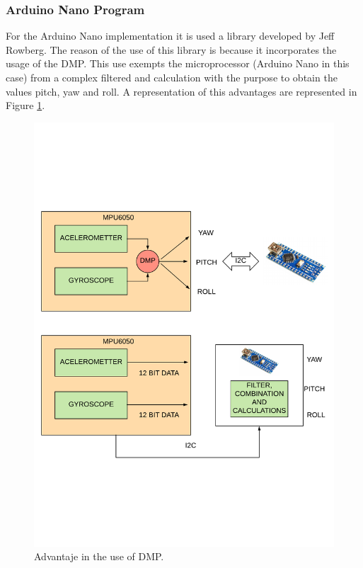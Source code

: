 \subsubsection{Arduino Nano Program}
For the Arduino Nano implementation it is used a library developed by Jeff Rowberg. The reason of the use of this library is because it incorporates the usage of the DMP. This use  exempts the microprocessor (Arduino Nano in this case) from a complex filtered and calculation with the purpose to obtain the values pitch, yaw and roll. A representation of this advantages are represented in Figure \ref{fig:DMPExample}.\newline
\begin{figure}[H]
	\center
	\includegraphics[trim = 0mm 4cm 0mm 2cm, clip,scale=0.6]{imagenes/Balancing_robot/DMPexample.pdf}
	\caption{Advantaje in the use of DMP.}
	\label{fig:DMPExample}
\end{figure} 


